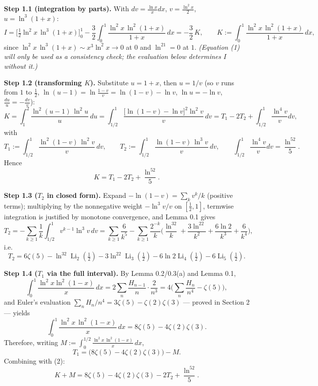 \documentclass[11pt]{article}
\theoremstyle{remark}
\begin{document}
\textbf{Step 1.1 (integration by parts).} With $dv=\frac{\ln x}{x}dx$, $v=\frac{\ln^2x}{2}$, $u=\ln^3(1+x)$:
\begin{equation}
I=\Big[\tfrac12\ln^2x\,\ln^3(1+x)\Big]_0^1-\frac32\int_0^1\frac{\ln^2x\,\ln^2(1+x)}{1+x}\,dx
=-\frac32\,K,\qquad K:=\int_0^1\frac{\ln^2x\,\ln^2(1+x)}{1+x}\,dx, \tag{1}
\end{equation}
since $\ln^2 x\,\ln^3(1+x)\sim x^3\ln^2x\to0$ at $0$ and $\ln^21=0$ at $1$.
\textit{(Equation (1) will only be used as a consistency check; the evaluation below determines $I$
without it.)}

\textbf{Step 1.2 (transforming $K$).} Substitute $u=1+x$, then $u=1/v$ (so $v$ runs from $1$ to $\tfrac12$,
$\ln(u-1)=\ln\frac{1-v}{v}=\ln(1-v)-\ln v$, $\ln u=-\ln v$, $\frac{du}{u}=-\frac{dv}{v}$):
\[
K=\int_1^2\frac{\ln^2(u-1)\,\ln^2u}{u}\,du
=\int_{1/2}^{1}\frac{\big[\ln(1-v)-\ln v\big]^2\ln^2 v}{v}\,dv
=T_1-2T_2+\int_{1/2}^1\frac{\ln^4v}{v}dv,
\]
with
\[
T_1:=\int_{1/2}^{1}\frac{\ln^2(1-v)\,\ln^2v}{v}\,dv,\qquad
T_2:=\int_{1/2}^{1}\frac{\ln(1-v)\,\ln^3v}{v}\,dv,\qquad
\int_{1/2}^1\frac{\ln^4v}{v}dv=\frac{\ln^52}{5}.
\]
Hence
\begin{equation}
K=T_1-2T_2+\frac{\ln^52}{5}. \tag{2}
\end{equation}

\textbf{Step 1.3 ($T_2$ in closed form).} Expand $-\ln(1-v)=\sum_k v^k/k$ (positive terms); multiplying
by the nonnegative weight $-\ln^3v/v$ on $[\tfrac12,1]$, termwise integration is justified by
monotone convergence, and Lemma 0.1 gives
\[
T_2=-\sum_{k\ge1}\frac1k\int_{1/2}^1v^{k-1}\ln^3v\,dv
=\sum_{k\ge1}\frac{6}{k^5}-\sum_{k\ge1}\frac{2^{-k}}{k}\Big(\frac{\ln^32}{k}+\frac{3\ln^22}{k^2}
+\frac{6\ln2}{k^3}+\frac{6}{k^4}\Big),
\]
i.e.
\begin{equation}
T_2=6\zeta(5)-\ln^32\operatorname{Li}_2(\tfrac12)-3\ln^22\operatorname{Li}_3(\tfrac12)
-6\ln2\operatorname{Li}_4(\tfrac12)-6\operatorname{Li}_5(\tfrac12). \tag{3}
\end{equation}

\textbf{Step 1.4 ($T_1$ via the full interval).} By Lemma 0.2/0.3(a) and Lemma 0.1,
\[
\int_0^1\frac{\ln^2x\ln^2(1-x)}{x}\,dx
=2\sum_{n}\frac{H_{n-1}}{n}\cdot\frac{2}{n^3}=4\big(\textstyle\sum_n\frac{H_n}{n^4}-\zeta(5)\big),
\]
and Euler's evaluation $\sum_n H_n/n^4=3\zeta(5)-\zeta(2)\zeta(3)$ --- proved in Section 2 --- yields
\begin{equation}
\int_0^1\frac{\ln^2x\,\ln^2(1-x)}{x}\,dx=8\zeta(5)-4\zeta(2)\zeta(3). \tag{4}
\end{equation}
Therefore, writing $M:=\displaystyle\int_0^{1/2}\frac{\ln^2x\,\ln^2(1-x)}{x}\,dx$,
\[
T_1=\big(8\zeta(5)-4\zeta(2)\zeta(3)\big)-M .
\]
Combining with (2):
\begin{equation}
\boxed{\;K+M=8\zeta(5)-4\zeta(2)\zeta(3)-2T_2+\frac{\ln^52}{5}.\;}\tag{E1}
\end{equation}
\end{document}
